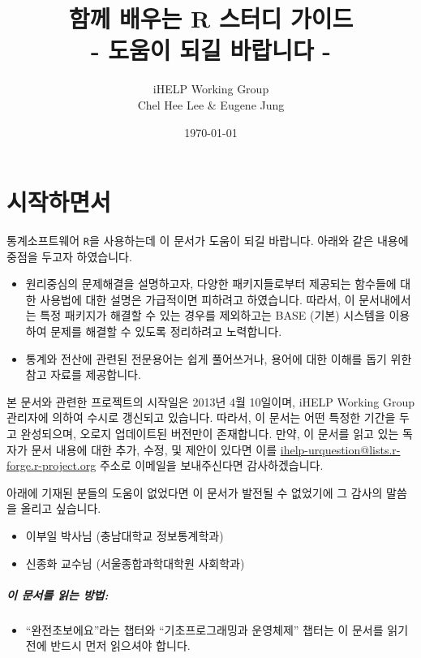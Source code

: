 \documentclass{report}
\title{함께 배우는 R 스터디 가이드 \\ - 도움이 되길 바랍니다 -}
\author{iHELP Working Group \\ Chel Hee Lee \& Eugene Jung }
\date{\today}
\begin{document}
\maketitle



\chapter{시작하면서}

통계소프트웨어 \texttt{R}을 사용하는데 이 문서가 도움이 되길 바랍니다. 
아래와 같은 내용에 중점을 두고자 하였습니다. 

\begin{itemize}
\item 원리중심의 문제해결을 설명하고자, 다양한 패키지들로부터 제공되는 함수들에 대한 사용법에 대한 설명은 가급적이면 피하려고 하였습니다.
따라서, 이 문서내에서는 특정 패키지가 해결할 수 있는 경우를 제외하고는 BASE (기본) 시스템을 이용하여 문제를 해결할 수 있도록 정리하려고 노력합니다.
\item 통계와 전산에 관련된 전문용어는 쉽게 풀어쓰거나, 용어에 대한 이해를 돕기 위한 참고 자료를 제공합니다. 
\end{itemize}

본 문서와 관련한 프로젝트의 시작일은 2013년 4월 10일이며, iHELP Working Group 관리자에 의하여 수시로 갱신되고 있습니다.
따라서, 이 문서는 어떤 특정한 기간을 두고 완성되으며, 오로지 업데이트된 버전만이 존재합니다.
만약, 이 문서를 읽고 있는 독자가 문서 내용에 대한 추가, 수정, 및 제안이 있다면 이를 \href{mailto:ihelp-urquestion@lists.r-forge.r-project.org}{ihelp-urquestion@lists.r-forge.r-project.org} 주소로 이메일을 보내주신다면 감사하겠습니다. 

아래에 기재된 분들의 도움이 없었다면 이 문서가 발전될 수 없었기에 그 감사의 말씀을 올리고 싶습니다. 
\begin{itemize}
\item 이부일 박사님 (충남대학교 정보통계학과)
\item 신종화 교수님 (서울종합과학대학원 사회학과)
\end{itemize}

\paragraph{이 문서를 읽는 방법:} 
\begin{itemize}
\item ``완전초보에요''라는 챕터와 ``기초프로그래밍과 운영체제'' 챕터는 이 문서를 읽기 전에 반드시 먼저 읽으셔야 합니다.  
\end{itemize}
\end{document}
